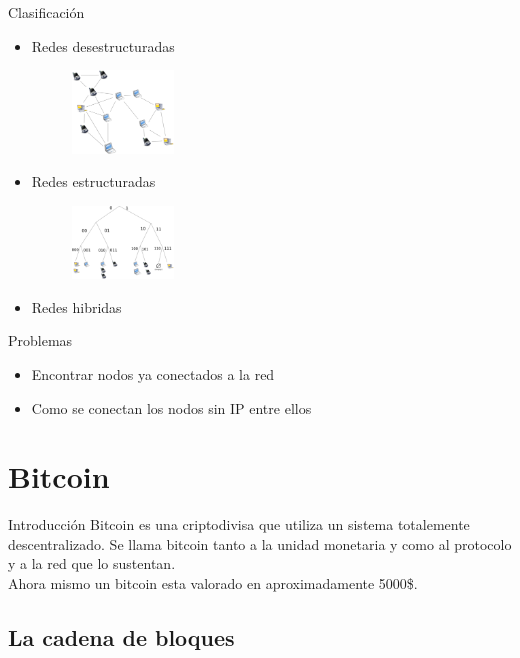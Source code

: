 \documentclass[compress,brown,xcolor=table]{beamer}
\begin{document}
\begin{frame}{Clasificación}
	\begin{itemize}
	\item Redes desestructuradas
	\begin{figure}
		\includegraphics[width=2.7cm]{../images/Unstructured.png}
		\centering		
		\label{p4}
	\end{figure}
	\item Redes estructuradas
	\begin{figure}
		\includegraphics[width=2.7cm]{../images/Structured.png}
		\centering		
		\label{p4}
	\end{figure}
	\item Redes hibridas
	
\end{itemize}
\end{frame}
\begin{frame}{Problemas}
	\begin{itemize}
	\item Encontrar nodos ya conectados a la red
	\item Como se conectan los nodos sin IP entre ellos
\end{itemize}
\end{frame}

\section{Bitcoin}
\begin{frame}{Introducción}
	Bitcoin es una criptodivisa que utiliza un sistema totalemente
descentralizado. Se llama bitcoin tanto a la unidad monetaria y como al
protocolo y a la red que lo sustentan.\\

Ahora mismo un bitcoin esta valorado en aproximadamente 5000\$.
\end{frame}

\subsection{La cadena de bloques}
\frame{\sectionpage}
\end{document}
